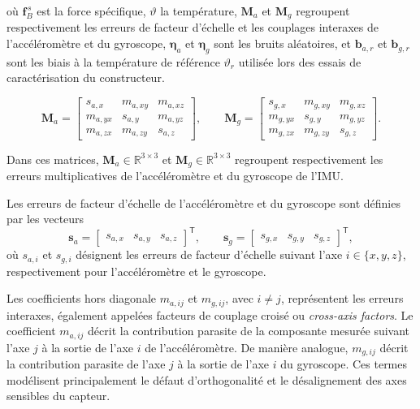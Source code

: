 \documentclass[11pt,a4paper,oneside]{report}
\newcommand{\vect}[1]{\bm{#1}}
\begin{document}
	où $\vect f_B^{\,s}$ est la force spécifique, $\vartheta$ la température, $\mathbf M_a$ et $\mathbf M_g$ regroupent respectivement les erreurs de facteur d'échelle et les couplages interaxes de l'accéléromètre et du gyroscope, $\vect\eta_a$ et $\vect\eta_g$ sont les bruits aléatoires, et $\vect b_{a,r}$ et $\vect b_{g,r}$ sont les biais à la température de référence $\vartheta_r$ utilisée lors des essais de caractérisation du constructeur.
	
	\[
	\mathbf{M}_a =
	\begin{bmatrix}
		s_{a,x}  & m_{a,xy} & m_{a,xz} \\
		m_{a,yx} & s_{a,y}  & m_{a,yz} \\
		m_{a,zx} & m_{a,zy} & s_{a,z}
	\end{bmatrix},
	\qquad
	\mathbf{M}_g =
	\begin{bmatrix}
		s_{g,x}  & m_{g,xy} & m_{g,xz} \\
		m_{g,yx} & s_{g,y}  & m_{g,yz} \\
		m_{g,zx} & m_{g,zy} & s_{g,z}
	\end{bmatrix}.
	\]
	
	
	Dans ces matrices, $\mathbf{M}_a \in \mathbb{R}^{3\times 3}$ et
	$\mathbf{M}_g \in \mathbb{R}^{3\times 3}$ regroupent respectivement les
	erreurs multiplicatives de l'accéléromètre et du gyroscope de l'IMU.
	
	Les erreurs de facteur d'échelle de l'accéléromètre et du gyroscope sont
	définies par les vecteurs
	\[
	\mathbf{s}_a =
	\begin{bmatrix}
		s_{a,x} & s_{a,y} & s_{a,z}
	\end{bmatrix}^{\mathsf T},
	\qquad
	\mathbf{s}_g =
	\begin{bmatrix}
		s_{g,x} & s_{g,y} & s_{g,z}
	\end{bmatrix}^{\mathsf T},
	\]
	où $s_{a,i}$ et $s_{g,i}$ désignent les erreurs de facteur d'échelle suivant
	l'axe $i\in\{x,y,z\}$, respectivement pour l'accéléromètre et le gyroscope.
	
	Les coefficients hors diagonale $m_{a,ij}$ et $m_{g,ij}$, avec $i\neq j$,
	représentent les erreurs interaxes, également appelées facteurs de couplage
	croisé ou \emph{cross-axis factors}. Le coefficient $m_{a,ij}$ décrit la
	contribution parasite de la composante mesurée suivant l'axe $j$ à la sortie
	de l'axe $i$ de l'accéléromètre. De manière analogue, $m_{g,ij}$ décrit la
	contribution parasite de l'axe $j$ à la sortie de l'axe $i$ du gyroscope.
	Ces termes modélisent principalement le défaut d'orthogonalité et le
	désalignement des axes sensibles du capteur.
	
\end{document}
